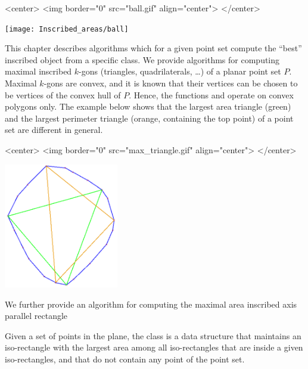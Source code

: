 

\begin{ccHtmlOnly}
<center>
<img border="0" src="ball.gif" align="center">
</center>
\end{ccHtmlOnly} 

\begin{ccTexOnly}
\begin{center}
\texttt{[image: Inscribed\_areas/ball]}
\end{center}
\end{ccTexOnly}

This chapter describes algorithms which for a given point set compute
the ``best'' inscribed object from a specific
class. We provide algorithms for
computing maximal inscribed $k$-gons (triangles, quadrilaterals,
\dots) of a planar point set $P$. Maximal $k$-gons are convex, and it
is known that their vertices can be chosen to be vertices of the
convex hull of $P$. Hence, the functions
 and
 operate on convex polygons
only. The example below shows that the largest area triangle (green)
and the largest perimeter triangle (orange, containing the top point)
of a point set are different in general.

\begin{ccHtmlOnly}
<center>
<img border="0" src="max_triangle.gif" align="center">
</center>
\end{ccHtmlOnly} 

\begin{ccTexOnly}
\begin{center}
\includegraphics[width=5cm]{Inscribed_areas/max_triangle}
\end{center}
\end{ccTexOnly}


We further provide an algorithm for computing the maximal area
inscribed axis parallel rectangle 

Given a set of points in the plane, the class 
is a data structure that maintains an iso-rectangle with the largest area among
all iso-rectangles that are inside a given iso-rectangles, and
that do not contain any point of the point set.

